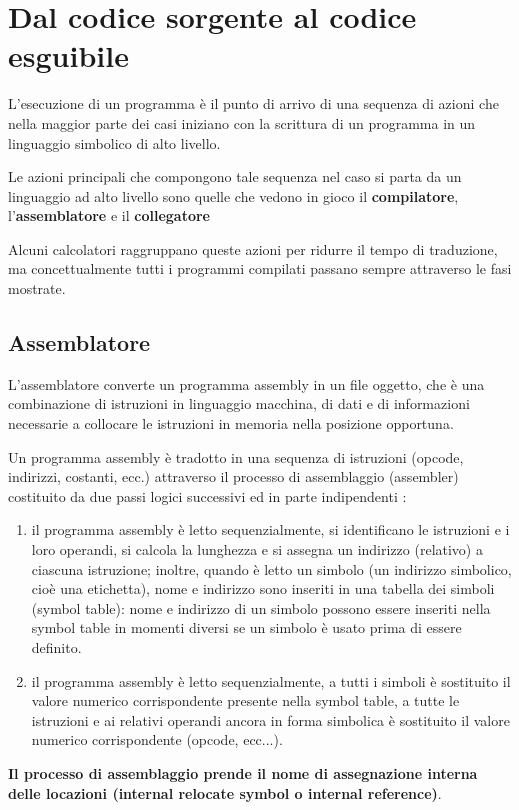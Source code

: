 \documentclass[12pt]{article} %
\begin{document}
\newpage
\section{Dal codice sorgente al codice esguibile}
L’esecuzione di un programma è il punto di arrivo di una sequenza di azioni che nella maggior parte dei casi iniziano con la scrittura di un programma in un linguaggio simbolico di alto livello.\par\medskip\noindent
Le azioni principali che compongono tale sequenza nel caso si parta da un linguaggio ad alto livello sono quelle che vedono in gioco il \textbf{compilatore}, l’\textbf{assemblatore} e il \textbf{collegatore}\par\medskip\noindent 
Alcuni calcolatori raggruppano queste azioni per ridurre il tempo di traduzione, ma concettualmente tutti i programmi compilati passano sempre attraverso le fasi mostrate.\par\medskip\noindent
\subsection{Assemblatore}
L’assemblatore converte un programma assembly in un file oggetto, che è una combinazione di istruzioni in linguaggio macchina, di dati e di informazioni necessarie a collocare le istruzioni in memoria nella posizione opportuna. \par\medskip\noindent
Un programma assembly è tradotto in una sequenza di istruzioni (opcode, indirizzi, costanti, ecc.) attraverso il processo di assemblaggio (assembler) costituito da due passi logici successivi ed in parte indipendenti :
\begin{enumerate}
    \item  il programma assembly è letto sequenzialmente, si identificano le istruzioni e i loro operandi, si calcola la lunghezza e si assegna un indirizzo (relativo) a ciascuna istruzione; inoltre, quando è letto un simbolo (un indirizzo simbolico, cioè una etichetta), nome e indirizzo sono inseriti in una tabella dei simboli (symbol table): nome e indirizzo di un simbolo possono essere inseriti nella symbol table in momenti diversi se un simbolo è usato prima di essere definito.
    \item il programma assembly è letto sequenzialmente, a tutti i simboli è sostituito il valore numerico corrispondente presente nella symbol table, a tutte le istruzioni e ai relativi operandi ancora in forma simbolica è sostituito il valore numerico corrispondente (opcode, ecc...).
\end{enumerate}
\textbf{Il processo di assemblaggio prende il nome di assegnazione interna delle locazioni (internal relocate symbol o internal reference)}.
\newpage
\end{document}

